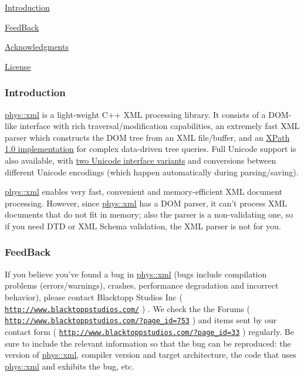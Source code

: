 \begin{DoxyItemize}
\item \hyperlink{XMLManual_XMLIntroduction}{Introduction}
\item \hyperlink{XMLManual_XMLFeedBack}{FeedBack}
\item \hyperlink{XMLManual_XMLAcknowledgments}{Acknowledgments}
\item \hyperlink{XMLManual_XMLLicense}{License}
\end{DoxyItemize}\hypertarget{XMLManual_XMLIntroduction}{}\subsubsection{Introduction}\label{XMLManual_XMLIntroduction}
\hyperlink{namespacephys_1_1xml}{phys::xml} is a light-\/weight C++ XML processing library. It consists of a DOM-\/like interface with rich traversal/modification capabilities, an extremely fast XML parser which constructs the DOM tree from an XML file/buffer, and an \hyperlink{classphys_1_1xml_1_1XPathQuery}{XPath 1.0 implementation} for complex data-\/driven tree queries. Full Unicode support is also available, with \hyperlink{XMLManual_XMLUnicode}{two Unicode interface variants} and conversions between different Unicode encodings (which happen automatically during parsing/saving). \par
 \par
 \hyperlink{namespacephys_1_1xml}{phys::xml} enables very fast, convenient and memory-\/efficient XML document processing. However, since \hyperlink{namespacephys_1_1xml}{phys::xml} has a DOM parser, it can't process XML documents that do not fit in memory; also the parser is a non-\/validating one, so if you need DTD or XML Schema validation, the XML parser is not for you. \par
 \par
 \hypertarget{XMLManual_XMLFeedBack}{}\subsubsection{FeedBack}\label{XMLManual_XMLFeedBack}
If you believe you've found a bug in \hyperlink{namespacephys_1_1xml}{phys::xml} (bugs include compilation problems (errors/warnings), crashes, performance degradation and incorrect behavior), please contact Blacktopp Studios Inc ( \href{http://www.blacktoppstudios.com/}{\tt http://www.blacktoppstudios.com/} ) . We check the the Forums ( \href{http://www.blacktoppstudios.com/?page_id=753}{\tt http://www.blacktoppstudios.com/?page\_\-id=753} ) and items sent by our contact form ( \href{http://www.blacktoppstudios.com/?page_id=33}{\tt http://www.blacktoppstudios.com/?page\_\-id=33} ) regularly. Be sure to include the relevant information so that the bug can be reproduced: the version of \hyperlink{namespacephys_1_1xml}{phys::xml}, compiler version and target architecture, the code that uses \hyperlink{namespacephys_1_1xml}{phys::xml} and exhibits the bug, etc. \par
